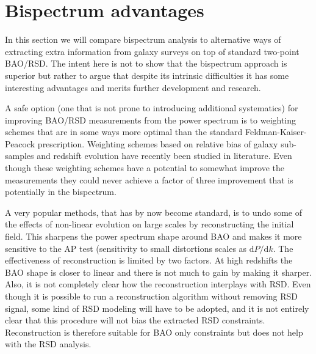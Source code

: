 \section{Bispectrum advantages}

In this section we will compare bispectrum analysis to alternative ways of
extracting extra information from galaxy surveys on top of standard two-point
BAO/RSD. The intent here is not to show that the bispectrum approach is
superior but rather to argue that despite its intrinsic difficulties it has
some interesting advantages and merits further development and research.

A safe option (one that is not prone to introducing additional systematics) for
improving BAO/RSD measurements from the power spectrum is to weighting schemes
that are in some ways more optimal than the standard Feldman-Kaiser-Peacock
prescription. Weighting schemes based on relative bias of galaxy sub-samples and
redshift evolution have recently been studied in literature. Even though these
weighting schemes have a potential to somewhat improve the measurements they
could never achieve a factor of three improvement that is potentially in the
bispectrum.

A very popular methods, that has by now become standard, is to undo some of the
effects of non-linear evolution on large scales by reconstructing the initial
field. This sharpens the power spectrum shape around BAO and makes it more
sensitive to the AP test (sensitivity to small distortions scales as
$\mathrm{d}P/\mathrm{d}k$. The effectiveness of reconstruction is limited by
two factors. At high redshifts the BAO shape is closer to linear and there is
not much to gain by making it sharper. Also, it is not completely clear how the
reconstruction interplays with RSD. Even though it is possible to run a
reconstruction algorithm without removing RSD signal, some kind of RSD modeling
will have to be adopted, and it is not entirely clear that this procedure will
not bias the extracted RSD constraints. Reconstruction is therefore suitable
for BAO only constraints but does not help with the RSD analysis.

